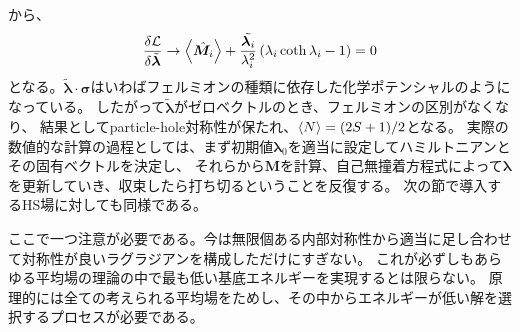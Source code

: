 \documentclass[11pt, aps, longbibliography]{article}
\begin{document}
        から、
        \begin{equation}\label{eq:highS-MF-25}
            \frac{\delta \mathcal{L}}{\delta \tilde{\boldsymbol{\lambda}}} \rightarrow \expval{\hat{\boldsymbol{M}_i}} +  \frac{\tilde{\boldsymbol{\lambda}_i}}{\lambda_i^2} \left( \lambda_i \coth \lambda_i -1 \right) = 0
        \end{equation}
        となる。$\tilde{\boldsymbol{\lambda}}\cdot \boldsymbol{\sigma}$はいわばフェルミオンの種類に依存した化学ポテンシャルのようになっている。
        したがって$\tilde{\boldsymbol{\lambda}}$がゼロベクトルのとき、フェルミオンの区別がなくなり、
        結果としてparticle-hole対称性が保たれ、$\expval{N}=(2S+1)/2$となる。
        実際の数値的な計算の過程としては、まず初期値$\boldsymbol{\lambda}_0$を適当に設定してハミルトニアンとその固有ベクトルを決定し、
        それらから$\boldsymbol{M}$を計算、自己無撞着方程式によって$\boldsymbol{\lambda}$を更新していき、収束したら打ち切るということを反復する。
        次の節で導入するHS場に対しても同様である。

        ここで一つ注意が必要である。今は無限個ある内部対称性から適当に足し合わせて対称性が良いラグラジアンを構成しただけにすぎない。
        これが必ずしもあらゆる平均場の理論の中で最も低い基底エネルギーを実現するとは限らない。
        原理的には全ての考えられる平均場をためし、その中からエネルギーが低い解を選択するプロセスが必要である。
\end{document}
